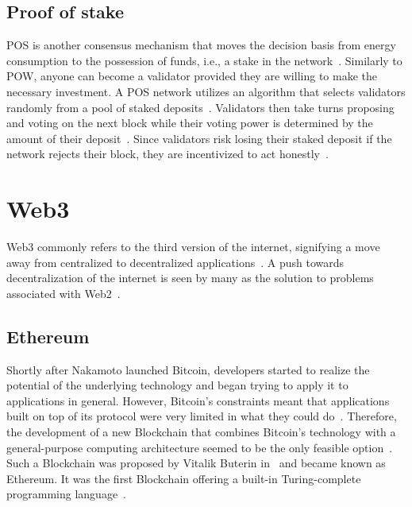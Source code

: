 \subsection{Proof of stake}\label{subsec:pos}

\Gls{POS} is another consensus mechanism that moves the decision basis from energy consumption to the possession of funds, i.e., a stake in the network~\autocites[321]{antonopoulos_mastering_2019}[chapter 1]{udokwu_state_2018}[3]{udokwu_evaluation_2020}.
Similarly to \gls{POW}, anyone can become a validator provided they are willing to make the necessary investment.
A \gls{POS} network utilizes an algorithm that selects validators randomly from a pool of staked deposits~\autocite[3]{udokwu_evaluation_2020}.
Validators then take turns proposing and voting on the next block while their voting power is determined by the amount of their deposit~\autocite[321]{antonopoulos_mastering_2019}.
Since validators risk losing their staked deposit if the network rejects their block, they are incentivized to act honestly~\autocite[321]{antonopoulos_mastering_2019}.

\section{Web3}\label{sec:web3}

\Gls{Web3} commonly refers to the third version of the internet, signifying a move away from centralized to decentralized applications~\autocite[xxxv]{antonopoulos_mastering_2019}.
A push towards decentralization of the internet is seen by many as the solution to problems associated with \gls{Web2}~\autocite{feiner_prominent_nodate}.

\subsection{Ethereum}\label{subsec:ethereum}

Shortly after Nakamoto launched Bitcoin, developers started to realize the potential of the underlying technology and began trying to apply it to applications in general.
However, Bitcoin's constraints meant that applications built on top of its protocol were very limited in what they could do~\autocite[3]{antonopoulos_mastering_2019}.
Therefore, the development of a new \gls{Blockchain} that combines Bitcoin's technology with a general-purpose computing architecture seemed to be the only feasible option~\autocite[3]{antonopoulos_mastering_2019}.
Such a \gls{Blockchain} was proposed by Vitalik Buterin in~\citeyear{buterin_ethereum_2014} and became known as Ethereum.
It was the first \gls{Blockchain} offering a built-in Turing-complete programming language~\autocite[13]{buterin_ethereum_2014}.

